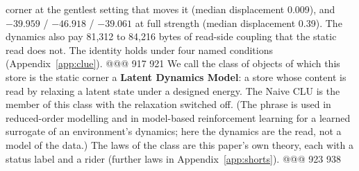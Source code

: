 corner at the gentlest setting that moves it (median displacement 0.009), and $-39.959$ /
$-46.918$ / $-39.061$ at full strength (median displacement 0.39). The dynamics also pay 81,312
to 84,216 bytes of read-side coupling that the static read does not. %
The identity holds under four named conditions (Appendix~\ref{app:clue}).
@@@ 917 921
We call the class of objects of which this store is the static corner a \textbf{Latent Dynamics
Model}: a store whose content is read by relaxing a latent state under a designed energy. The
Naive CLU is the member of this class with the relaxation switched off. (The phrase is used in
reduced-order modelling and in model-based reinforcement learning for a learned surrogate of an
environment's dynamics; here the dynamics are the read, not a model of the data.) The laws of the
class are this paper's own theory, each with a status label and a rider (further laws in
Appendix~\ref{app:shorts}).
@@@ 923 938
